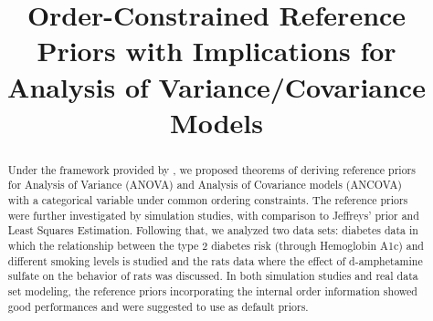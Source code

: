 \documentclass[Proceedings]{ascelike}
\begin{document}
%
\title{Order-Constrained Reference Priors with
Implications for Analysis of Variance/Covariance Models}
%
\author{
%
%
%
%
%
%
%
}
%
\maketitle
%
\begin{abstract}
Under the framework provided by \cite{BergerBernardo1992}, we proposed
theorems of deriving reference priors for Analysis of Variance (ANOVA)
and Analysis of Covariance models (ANCOVA) with a categorical variable
under common ordering constraints. The reference priors were further
investigated by simulation studies, with comparison to Jeffreys' prior
and Least Squares Estimation. Following that, we analyzed two data
sets: diabetes data in which the relationship between the type 2
diabetes risk (through Hemoglobin A1c) and different smoking levels is
studied and the rats data where the effect of d-amphetamine sulfate on
the behavior of rats was discussed. In both simulation studies and
real data set modeling, the reference priors incorporating the
internal order information showed good performances and were suggested
to use as default priors.
\end{abstract}
%
%
%
\end{document}
